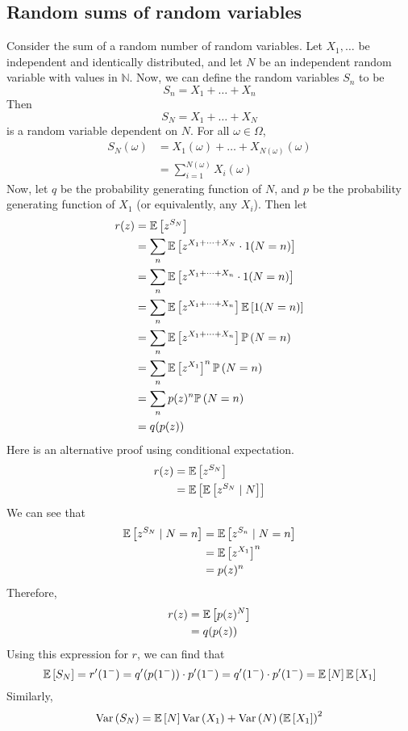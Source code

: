 \subsection{Random sums of random variables}
Consider the sum of a random number of random variables.
Let \(X_1, \dots\) be independent and identically distributed, and let \(N\) be an independent random variable with values in \(\mathbb N\).
Now, we can define the random variables \(S_n\) to be
\[
	S_n = X_1 + \dots + X_n
\]
Then
\[
	S_N = X_1 + \dots + X_N
\]
is a random variable dependent on \(N\).
For all \(\omega \in \Omega\),
\begin{align*}
	S_N(\omega) & = X_1(\omega) + \dots + X_{N(\omega)}(\omega) \\
	            & = \sum_{i=1}^{N(\omega)} X_i(\omega)
\end{align*}
Now, let \(q\) be the probability generating function of \(N\), and \(p\) be the probability generating function of \(X_1\) (or equivalently, any \(X_i\)).
Then let
\begin{align*}
	r(z) & = \mathbb{E}\left[{z^{S_N}}\right]                                          \\
	     & = \sum_{n} \mathbb{E}\left[{z^{X_1 + \dots + X_N} \cdot 1(N = n)}\right]    \\
	     & = \sum_{n} \mathbb{E}\left[{z^{X_1 + \dots + X_n} \cdot 1(N = n)}\right]    \\
	     & = \sum_{n} \mathbb{E}\left[{z^{X_1 + \dots + X_n}}\right] \mathbb{E}\left[{1(N = n)}\right] \\
	     & = \sum_{n} \mathbb{E}\left[{z^{X_1 + \dots + X_n}}\right] \mathbb{P}\left({N = n}\right)      \\
	     & = \sum_{n} \mathbb{E}\left[{z^{X_1}}\right]^n \mathbb{P}\left({N = n}\right)                  \\
	     & = \sum_{n} p(z)^n \mathbb{P}\left({N = n}\right)                              \\
	     & = q(p(z))
\end{align*}
Here is an alternative proof using conditional expectation.
\begin{align*}
	r(z) & = \mathbb{E}\left[{z^{S_N}}\right]                 \\
	     & = \mathbb{E}\left[{\mathbb{E}\left[{z^{S_N} \mid N}\right]}\right] \\
\end{align*}
We can see that
\begin{align*}
	\mathbb{E}\left[{z^{S_N} \mid N = n}\right] & = \mathbb{E}\left[{z^{S_n} \mid N = n}\right] \\
	                            & = \mathbb{E}\left[{z^{X_1}}\right]^n          \\
	                            & = p(z)^n
\end{align*}
Therefore,
\begin{align*}
	r(z) & = \mathbb{E}\left[{p(z)^N}\right] \\
	     & = q(p(z))
\end{align*}
Using this expression for \(r\), we can find that
\[
	\mathbb{E}\left[{S_N}\right] = r'(1^-) = q'(p(1^-)) \cdot p'(1^-) = q'(1^-) \cdot p'(1^-) = \mathbb{E}\left[{N}\right] \mathbb{E}\left[{X_1}\right]
\]
Similarly,
\[
	\operatorname{Var}\left({S_N}\right) = \mathbb{E}\left[{N}\right] \operatorname{Var}\left({X_1}\right) + \operatorname{Var}\left({N}\right) \left( \mathbb{E}\left[{X_1}\right] \right)^2
\]
